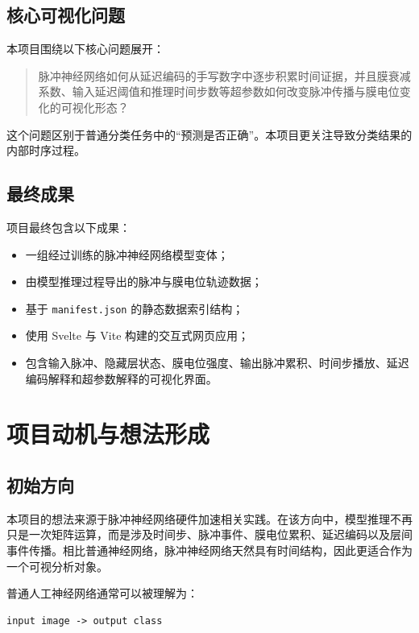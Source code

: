 \documentclass[UTF8,11pt,a4paper]{ctexart}
\begin{document}
\subsection{核心可视化问题}

本项目围绕以下核心问题展开：

\begin{quote}
脉冲神经网络如何从延迟编码的手写数字中逐步积累时间证据，并且膜衰减系数、输入延迟阈值和推理时间步数等超参数如何改变脉冲传播与膜电位变化的可视化形态？
\end{quote}

这个问题区别于普通分类任务中的“预测是否正确”。本项目更关注导致分类结果的内部时序过程。

\subsection{最终成果}

项目最终包含以下成果：

\begin{itemize}
    \item 一组经过训练的脉冲神经网络模型变体；
    \item 由模型推理过程导出的脉冲与膜电位轨迹数据；
    \item 基于 \texttt{manifest.json} 的静态数据索引结构；
    \item 使用 Svelte 与 Vite 构建的交互式网页应用；
    \item 包含输入脉冲、隐藏层状态、膜电位强度、输出脉冲累积、时间步播放、延迟编码解释和超参数解释的可视化界面。
\end{itemize}

\section{项目动机与想法形成}

\subsection{初始方向}

本项目的想法来源于脉冲神经网络硬件加速相关实践。在该方向中，模型推理不再只是一次矩阵运算，而是涉及时间步、脉冲事件、膜电位累积、延迟编码以及层间事件传播。相比普通神经网络，脉冲神经网络天然具有时间结构，因此更适合作为一个可视分析对象。

普通人工神经网络通常可以被理解为：

\begin{lstlisting}
input image -> output class
\end{lstlisting}
\end{document}
